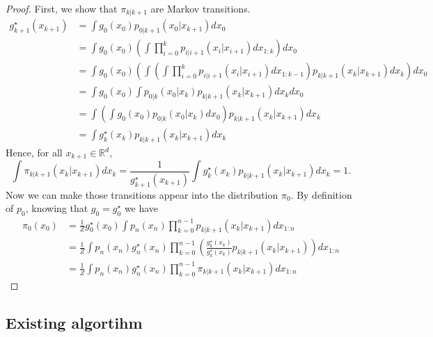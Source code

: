 \documentclass[12pt]{article}
\begin{document}
\begin{proof}
    First, we show that $\pi_{k|k+1}$ are Markov transitions. 
    \begin{align*}
        g_{k+1}^\star(x_{k+1})
        & = \int g_0(x_0) p_{0|k+1}(x_0 | x_{k+1}) dx_0 \\
        & = \int g_0(x_0) \left( \int \prod_{i=0}^{k} p_{i|i+1}(x_i | x_{i+1}) dx_{1:k} \right) dx_0 \\
        & = \int g_0(x_0) \left(\int \left( \int \prod_{i=0}^{k} p_{i|i+1}(x_i | x_{i+1}) dx_{1:k-1} \right) 
        p_{k|k+1}(x_k | x_{k+1}) dx_k \right) dx_0 \\
        & = \int g_0(x_0) \int p_{0|k}(x_0 | x_k) p_{k|k+1}(x_k | x_{k+1}) dx_k dx_0 \\
        & = \int \left( \int g_0(x_0) p_{0|k}(x_0 | x_k) dx_0 \right) p_{k|k+1}(x_k | x_{k+1}) dx_k \\
        & = \int g_k^\star(x_k) p_{k|k+1}(x_k | x_{k+1}) dx_k
    \end{align*}
    Hence, for all $x_{k+1} \in \mathbb{R}^d$,
    $$\int \pi_{k|k+1}(x_k | x_{k+1}) dx_k 
    = \frac{1}{g_{k+1}^\star(x_{k+1})} \int g_k^\star(x_k) p_{k|k+1}(x_k | x_{k+1}) dx_k = 1.$$
    Now we can make those transitions appear into the distribution $\pi_0$.
    By definition of $p_0$, knowing that $g_0 = g_0^\star$ we have
    \begin{align*}
        \pi_0(x_0)
        & = \frac{1}{Z} g_0^\star(x_0) \int p_n(x_n) \prod_{k=0}^{n-1} p_{k|k+1}(x_k | x_{k+1}) dx_{1:n}\\
        & = \frac{1}{Z} \int p_n(x_n) g_n^\star(x_n) \prod_{k=0}^{n-1} \left( \frac{g_k^\star(x_k)}{g_k^\star(x_k)} p_{k|k+1}(x_k | x_{k+1}) \right) dx_{1:n} \\
        & = \frac{1}{Z} \int p_n(x_n) g_n^\star(x_n) \prod_{k=0}^{n-1} \pi_{k|k+1}(x_k | x_{k+1}) dx_{1:n}
    \end{align*}
\end{proof}

\subsection{Existing algortihm}
\end{document}
